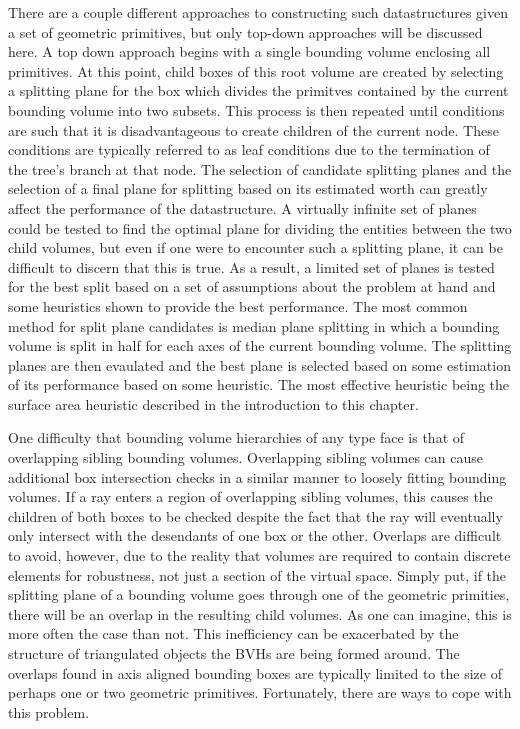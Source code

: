 \documentclass[12pt, a4paper]{article}
\begin{document}
There are a couple different approaches to constructing such datastructures given a set of geometric primitives, but only top-down approaches will be discussed here. A top down approach begins with a single bounding volume enclosing all primitives. At this point, child boxes of this root volume are created by selecting a splitting plane for the box which divides the primitves contained by the current bounding volume into two subsets. This process is then repeated until conditions are such that it is disadvantageous to create children of the current node. These conditions are typically referred to as leaf conditions due to the termination of the tree's branch at that node. The selection of candidate splitting planes and the selection of a final plane for splitting based on its estimated worth can greatly affect the performance of the datastructure. A virtually infinite set of planes could be tested to find the optimal plane for dividing the entities between the two child volumes, but even if one were to encounter such a splitting plane, it can be difficult to discern that this is true. As a result, a limited set of planes is tested for the best split based on a set of assumptions about the problem at hand and some heuristics shown to provide the best performance. The most common method for split plane candidates is median plane splitting in which a bounding volume is split in half for each axes of the current bounding volume. The splitting planes are then evaulated and the best plane is selected based on some estimation of its performance based on some heuristic. The most effective heuristic being the surface area heuristic described in the introduction to this chapter.

One difficulty that bounding volume hierarchies of any type face is that of overlapping sibling bounding volumes. Overlapping sibling volumes can cause additional box intersection checks in a similar manner to loosely fitting bounding volumes. If a ray enters a region of overlapping sibling volumes, this causes the children of both boxes to be checked despite the fact that the ray will eventually only intersect with the desendants of one box or the other. Overlaps are difficult to avoid, however, due to the reality that volumes are required to contain discrete elements for robustness, not just a section of the virtual space. Simply put, if the splitting plane of a bounding volume goes through one of the geometric primities, there will be an overlap in the resulting child volumes. As one can imagine, this is more often the case than not. This inefficiency can be exacerbated by the structure of triangulated objects the BVHs are being formed around. The overlaps found in axis aligned bounding boxes are typically limited to the size of perhaps one or two geometric primitives. Fortunately, there are ways to cope with this problem.
\end{document}

